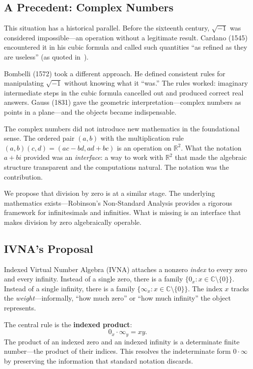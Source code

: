 \documentclass[12pt]{article}
\theoremstyle{definition}
\theoremstyle{remark}
\newcommand{\vz}[1]{0_{#1}}             %
\newcommand{\vi}[1]{\infty_{#1}}        %
\newcommand{\R}{\mathbb{R}}
\newcommand{\C}{\mathbb{C}}
\begin{document}
\subsection{A Precedent: Complex Numbers}

This situation has a historical parallel. Before the sixteenth century,
$\sqrt{-1}$ was considered impossible---an operation without a legitimate
result. Cardano (1545) encountered it in his cubic formula and called such
quantities ``as refined as they are useless'' (as quoted in~\cite{carlstrom2004}).

Bombelli (1572) took a different approach. He defined consistent rules
for manipulating $\sqrt{-1}$ without knowing what it ``was.'' The rules
worked: imaginary intermediate steps in the cubic formula cancelled out
and produced correct real answers. Gauss (1831) gave the geometric
interpretation---complex numbers as points in a plane---and the objects
became indispensable.

The complex numbers did not introduce new mathematics in the foundational
sense. The ordered pair $(a, b)$ with the multiplication rule
$(a,b)(c,d) = (ac - bd, ad + bc)$ is an operation on $\R^2$. What the
notation $a + bi$ provided was an \emph{interface}: a way to work with
$\R^2$ that made the algebraic structure transparent and the computations
natural. The notation was the contribution.

We propose that division by zero is at a similar stage. The underlying
mathematics exists---Robinson's Non-Standard Analysis provides a rigorous
framework for infinitesimals and infinities. What is missing is an
interface that makes division by zero algebraically operable.

\subsection{IVNA's Proposal}

Indexed Virtual Number Algebra (IVNA) attaches a nonzero \emph{index}
to every zero and every infinity. Instead of a single zero, there is a
family $\{\vz{x} : x \in \C \setminus \{0\}\}$. Instead of a single
infinity, there is a family $\{\vi{x} : x \in \C \setminus \{0\}\}$.
The index $x$ tracks the \emph{weight}---informally, ``how much zero''
or ``how much infinity'' the object represents.

The central rule is the \textbf{indexed product}:
\begin{equation}
\label{eq:product}
\vz{x} \cdot \vi{y} = xy.
\end{equation}
The product of an indexed zero and an indexed infinity is a determinate
finite number---the product of their indices. This resolves the
indeterminate form $0 \cdot \infty$ by preserving the information that
standard notation discards.
\end{document}
